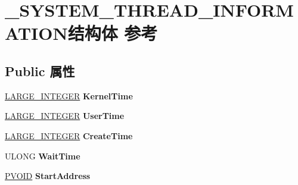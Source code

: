 \hypertarget{struct___s_y_s_t_e_m___t_h_r_e_a_d___i_n_f_o_r_m_a_t_i_o_n}{}\section{\+\_\+\+S\+Y\+S\+T\+E\+M\+\_\+\+T\+H\+R\+E\+A\+D\+\_\+\+I\+N\+F\+O\+R\+M\+A\+T\+I\+O\+N结构体 参考}
\label{struct___s_y_s_t_e_m___t_h_r_e_a_d___i_n_f_o_r_m_a_t_i_o_n}
\subsection*{Public 属性}
\begin{DoxyCompactItemize}
\item 
\mbox{\label{struct___s_y_s_t_e_m___t_h_r_e_a_d___i_n_f_o_r_m_a_t_i_o_n_a564e7dd23c63f396218c6e3a0e4eee11}} 
\hyperlink{union___l_a_r_g_e___i_n_t_e_g_e_r}{L\+A\+R\+G\+E\+\_\+\+I\+N\+T\+E\+G\+ER} {\bfseries Kernel\+Time}
\item 
\mbox{\label{struct___s_y_s_t_e_m___t_h_r_e_a_d___i_n_f_o_r_m_a_t_i_o_n_a16710f36176fd24d13291011038d66bf}} 
\hyperlink{union___l_a_r_g_e___i_n_t_e_g_e_r}{L\+A\+R\+G\+E\+\_\+\+I\+N\+T\+E\+G\+ER} {\bfseries User\+Time}
\item 
\mbox{\label{struct___s_y_s_t_e_m___t_h_r_e_a_d___i_n_f_o_r_m_a_t_i_o_n_a4b8b81c13453b26fddba3ce718b682c7}} 
\hyperlink{union___l_a_r_g_e___i_n_t_e_g_e_r}{L\+A\+R\+G\+E\+\_\+\+I\+N\+T\+E\+G\+ER} {\bfseries Create\+Time}
\item 
\mbox{\label{struct___s_y_s_t_e_m___t_h_r_e_a_d___i_n_f_o_r_m_a_t_i_o_n_a4e3fa57cc4de5c02295309a9dfa58d57}} 
U\+L\+O\+NG {\bfseries Wait\+Time}
\item 
\mbox{\label{struct___s_y_s_t_e_m___t_h_r_e_a_d___i_n_f_o_r_m_a_t_i_o_n_a9ba14c874f3649b36beb9a4b6543e73b}} 
\hyperlink{interfacevoid}{P\+V\+O\+ID} {\bfseries Start\+Address}
\item 

\end{DoxyCompactItemize}
